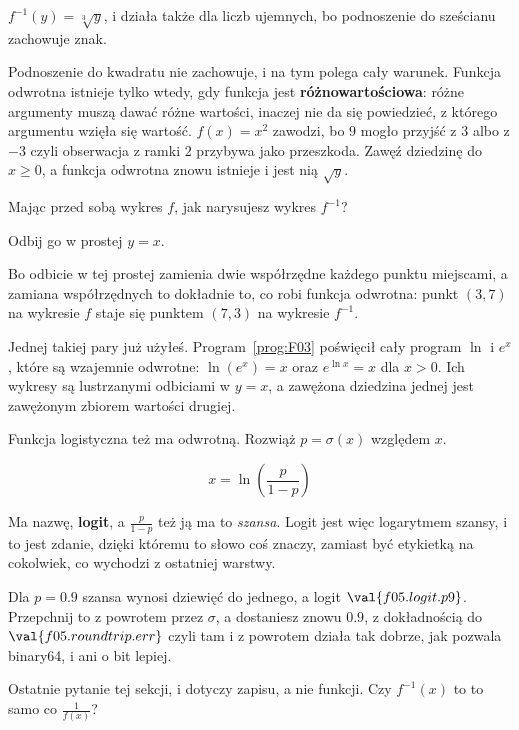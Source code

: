 \begin{fr}
$f^{-1}(y) = \sqrt[3]{y}$, i działa także dla liczb ujemnych, bo podnoszenie do
sześcianu zachowuje znak.

Podnoszenie do kwadratu nie zachowuje, i na tym polega cały warunek. Funkcja
odwrotna istnieje tylko wtedy, gdy funkcja jest \textbf{różnowartościowa}:
różne argumenty muszą dawać różne wartości, inaczej nie da się powiedzieć, z
którego argumentu wzięła się wartość. $f(x) = x^{2}$ zawodzi, bo $9$ mogło
przyjść z $3$ albo z $-3$ \dash{} czyli obserwacja z ramki $2$ przybywa jako
przeszkoda. Zawęź dziedzinę do $x \ge 0$, a funkcja odwrotna znowu istnieje i
jest nią $\sqrt{y}$.

Mając przed sobą wykres $f$, jak narysujesz wykres $f^{-1}$?
\nextframe
\end{fr}

\begin{fr}
\begin{ansblock}
Odbij go w prostej $y = x$.
\end{ansblock}

Bo odbicie w tej prostej zamienia dwie współrzędne każdego punktu miejscami, a
zamiana współrzędnych to dokładnie to, co robi funkcja odwrotna: punkt
$(3, 7)$ na wykresie $f$ staje się punktem $(7, 3)$ na wykresie $f^{-1}$.

Jednej takiej pary już użyłeś. Program~\ref{prog:F03} poświęcił cały program
$\ln$ i $e^{x}$, które są wzajemnie odwrotne: $\ln(e^{x}) = x$ oraz
$e^{\ln x} = x$ dla $x > 0$. Ich wykresy są lustrzanymi odbiciami w $y = x$, a
zawężona dziedzina jednej jest zawężonym zbiorem wartości drugiej.

Funkcja logistyczna też ma odwrotną. Rozwiąż $p = \sigma(x)$ względem $x$.
\nextframe
\end{fr}

\begin{fr}
\begin{ansblock}
\[ x = \ln\!\left(\frac{p}{1 - p}\right) \]
\end{ansblock}

Ma nazwę, \textbf{logit}, a $\frac{p}{1-p}$ też ją ma \dash{} to
\emph{szansa}. Logit jest więc logarytmem szansy, i to jest zdanie, dzięki
któremu to słowo coś znaczy, zamiast być etykietką na cokolwiek, co wychodzi z
ostatniej warstwy.

Dla $p = \num{0.9}$ szansa wynosi dziewięć do jednego, a logit
$\val{f05.logit.p9}$. Przepchnij to z powrotem przez $\sigma$, a dostaniesz
znowu $\num{0.9}$, z dokładnością do $\val{f05.roundtrip.err}$ \dash{} czyli
tam i z powrotem działa tak dobrze, jak pozwala binary64, i ani o bit lepiej.

Ostatnie pytanie tej sekcji, i dotyczy zapisu, a nie funkcji. Czy $f^{-1}(x)$
to to samo co $\frac{1}{f(x)}$?
\nextframe
\end{fr}


